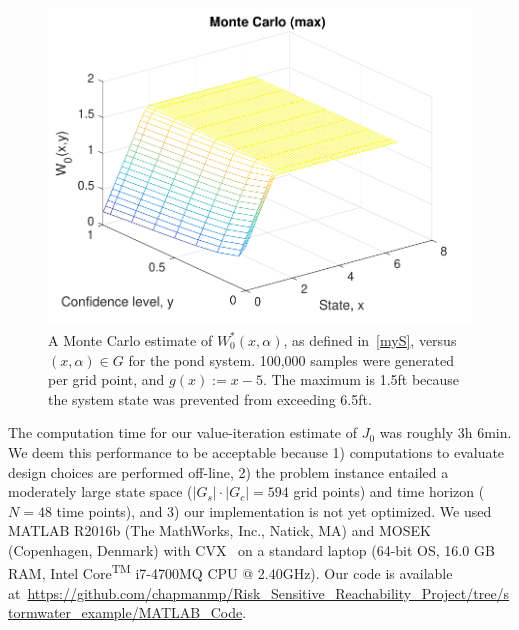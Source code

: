 \documentclass[letterpaper, 10 pt, conference]{ieeeconf}  %
\begin{document}
\begin{figure}[thpb]
      \centering
      \includegraphics[scale=0.5]{monte_carlo_max_sept112018.pdf}
      \caption{A Monte Carlo estimate of $W_0^*(x,\alpha)$, as defined in~\eqref{myS}, versus $(x, \alpha) \in G$ for the pond system.
	  100,000 samples were generated per grid point, and $g(x) := x - 5$. 
	  The maximum is 1.5ft because the system state was prevented from exceeding 6.5ft.}
      \label{W0mc}
\end{figure}

The computation time for our value-iteration estimate of $J_0$ was roughly 3h 6min.
We deem this performance to be acceptable because  
1) computations to evaluate design choices are performed off-line, 
2) the problem instance entailed a moderately large state space ($|G_s|\cdot|G_c| = 594$ grid points) and time horizon ($N = 48$ time points),
and 3) our implementation is not yet optimized.
We used MATLAB R2016b (The MathWorks, Inc., Natick, MA) and MOSEK (Copenhagen, Denmark) with CVX~\cite{grant2008cvx} on a
standard laptop (64-bit OS, 16.0 GB RAM, Intel\textsuperscript{\textregistered} Core\textsuperscript{TM} i7-4700MQ CPU @ 2.40GHz).
Our code is available at~\url{https://github.com/chapmanmp/Risk_Sensitive_Reachability_Project/tree/stormwater_example/MATLAB_Code}.
\end{document}
